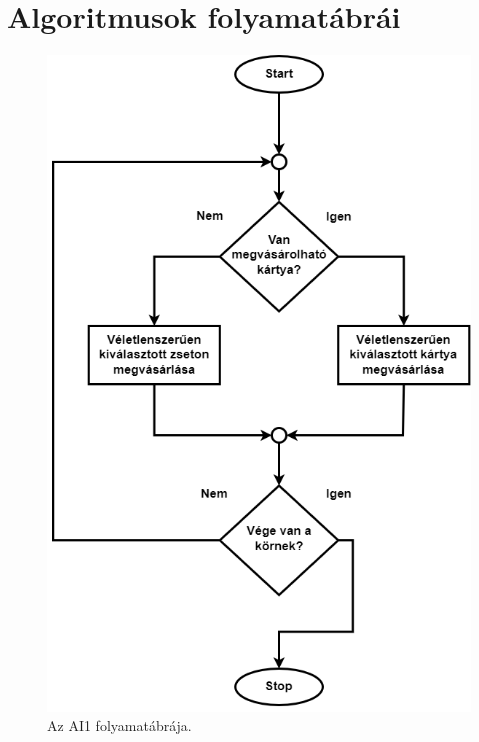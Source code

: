 \chapter{Algoritmusok folyamatábrái}

\begin{figure}[h]
\centering
\includegraphics[scale=0.5]{images/firstAI_flowchart.png}
\caption{Az AI1 folyamatábrája.}
\label{fig:AI1_flowchart}
\end{figure}

